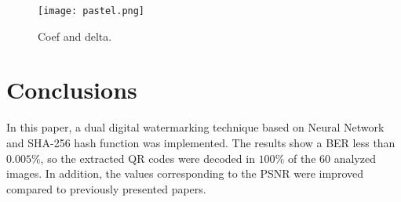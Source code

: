 \documentclass[runningheads]{llncs}
\begin{document}
\begin{figure} [H]
	\begin{center}
		\texttt{[image: pastel.png]}
		\caption{Coef and delta.} \label{pastel}
	\end{center}
\end{figure}

\section{Conclusions}
In this paper, a dual digital watermarking technique based on Neural Network and SHA-256 hash function was implemented. The results show a BER less than $0.005 \%$, so the extracted QR codes were decoded in $100\%$ of the $60$ analyzed images. In addition, the values corresponding to the PSNR were improved compared to previously presented papers.
%
%
%


%
\end{document}

